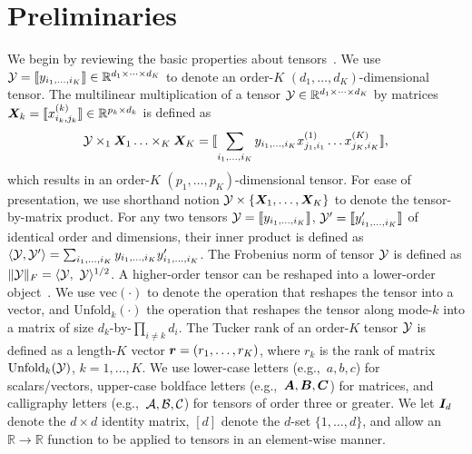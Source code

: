 \documentclass{article}
\theoremstyle{plain}
\theoremstyle{definition}
\begin{document}
\section{Preliminaries}
We begin by reviewing the basic properties about tensors~\cite{kolda2009tensor}. We use $\mathcal{Y}=\llbracket y_{i_1,\ldots,i_K} \rrbracket\in \mathbb{R}^{d_1\times \cdots\times d_K}$ to denote an order-$K$ $(d_1,\ldots,d_K)$-dimensional tensor. The multilinear multiplication of a tensor $\mathcal{Y}\in\mathbb{R}^{d_1\times \cdots\times d_K}$ by matrices $\bm X_k=\llbracket x_{i_k,j_k}^{(k)} \rrbracket\in\mathbb{R}^{p_k\times d_k}$ is defined as
\[
\mathcal{Y} \times_1\bm X_1\ldots \times_K \bm X_K=\llbracket \sum_{i_1,\ldots,i_K}y_{i_1,\ldots,i_K}x_{j_1,i_1}^{(1)}\ldots x_{j_K,i_K}^{(K)} \rrbracket,
\]
which results in an order-$K$ $(p_1,\ldots,p_K)$-dimensional tensor. For ease of presentation, we use shorthand notion $\mathcal{Y}\times\{\bm X_1,\ldots,\bm X_K\}$ to denote the tensor-by-matrix product. For any two tensors $\mathcal{Y}=\llbracket y_{i_1,\ldots,i_K} \rrbracket$, $\mathcal{Y}'=\llbracket y'_{i_1,\ldots,i_K} \rrbracket$ of identical order and dimensions, their inner product is defined as $\langle \mathcal{Y}, \mathcal{Y}'\rangle =\sum_{i_1,\ldots,i_K}y_{i_1,\ldots,i_K}y'_{i_1,\ldots,i_K}$. The Frobenius norm of tensor $\mathcal{Y}$ is defined as $\FnormSize{}{\tY}=\langle \tY,\ \tY \rangle^{1/2}$. A higher-order tensor can be reshaped into a lower-order object~\cite{wang2017operator}. We use $\text{vec}(\cdot)$ to denote the operation that reshapes the tensor into a vector, and $\text{Unfold}_k(\cdot)$ the operation that reshapes the tensor along mode-$k$ into a matrix of size $d_k$-by-$\prod_{i\neq k}d_i$. The Tucker rank of an order-$K$ tensor $\mathcal{Y}$ is defined as a length-$K$ vector $\bm{r}=(r_1,\ldots,r_K)$, where $r_k$ is the rank of matrix $\text{Unfold}_k(\mathcal{Y})$, $k=1,\ldots,K$. We use lower-case letters (e.g.,\ $a,b,c$) for scalars/vectors, upper-case boldface letters (e.g.,\ $\bm A,\bm B,\bm C$) for matrices, and calligraphy letters (e.g.,\ $\mathcal{A}, \mathcal{B}, \mathcal{C}$) for tensors of order three or greater. We let $\bm I_d$ denote the $d \times d$ identity matrix, $[d]$ denote the $d$-set $\{1,\ldots,d\}$, and allow an $\mathbb{R}\to \mathbb{R}$ function to be applied to tensors in an element-wise manner. 
\end{document}
